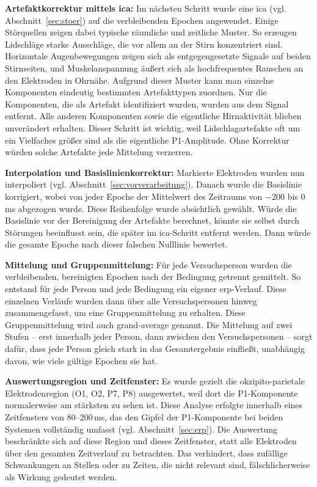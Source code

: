 \textbf{Artefaktkorrektur mittels \acrshort{ica}:} Im nächsten Schritt wurde eine \acrshort{ica} (vgl. Abschnitt~\ref{sec:stoer}) auf die verbleibenden Epochen angewendet. Einige Störquellen zeigen dabei typische räumliche und zeitliche Muster. So erzeugen Lidschläge starke Ausschläge, die vor allem an der Stirn konzentriert sind. Horizontale Augenbewegungen zeigen sich als entgegengesetzte Signale auf beiden Stirnseiten, und Muskelanspannung äußert sich als hochfrequentes Rauschen an den Elektroden in Ohrnähe. Aufgrund dieser Muster kann man einzelne Komponenten eindeutig bestimmten Artefakttypen zuordnen. Nur die Komponenten, die als Artefakt identifiziert wurden, wurden aus dem Signal entfernt. Alle anderen Komponenten sowie die eigentliche Hirnaktivität blieben unverändert erhalten. Dieser Schritt ist wichtig, weil Lidschlagartefakte oft um ein Vielfaches größer sind als die eigentliche P1-Amplitude. Ohne Korrektur würden solche Artefakte jede Mittelung verzerren.

\textbf{Interpolation und Basislinienkorrektur:} Markierte Elektroden wurden nun interpoliert (vgl. Abschnitt~\ref{sec:vorverarbeitung}). Danach wurde die Basislinie korrigiert, wobei von jeder Epoche der Mittelwert des Zeitraums von $-$200 bis 0\,ms abgezogen wurde. Diese Reihenfolge wurde absichtlich gewählt. Würde die Basislinie vor der Bereinigung der Artefakte berechnet, könnte sie selbst durch Störungen beeinflusst sein, die später im \acrshort{ica}-Schritt entfernt werden. Dann würde die gesamte Epoche nach dieser falschen Nulllinie bewertet.

\textbf{Mittelung und Gruppenmittelung:} Für jede Versuchsperson wurden die verbleibenden, bereinigten Epochen nach der Bedingung getrennt gemittelt. So entstand für jede Person und jede Bedingung ein eigener \acrshort{erp}-Verlauf. Diese einzelnen Verläufe wurden dann über alle Versuchspersonen hinweg zusammengefasst, um eine Gruppenmittelung zu erhalten. Diese Gruppenmittelung wird auch \gls{grand-average} genannt. Die Mittelung auf zwei Stufen -- erst innerhalb jeder Person, dann zwischen den Versuchspersonen -- sorgt dafür, dass jede Person gleich stark in das Gesamtergebnis einfließt, unabhängig davon, wie viele gültige Epochen sie hat.

\textbf{Auswertungsregion und Zeitfenster:} Es wurde gezielt die okzipito-parietale Elektrodenregion (O1, O2, P7, P8) ausgewertet, weil dort die P1-Komponente normalerweise am stärksten zu sehen ist. Diese Analyse erfolgte innerhalb eines Zeitfensters von 80--200\,ms, das den Gipfel der P1-Komponente bei beiden Systemen vollständig umfasst (vgl. Abschnitt~\ref{sec:erp}). Die Auswertung beschränkte sich auf diese Region und dieses Zeitfenster, statt alle Elektroden über den gesamten Zeitverlauf zu betrachten. Das verhindert, dass zufällige Schwankungen an Stellen oder zu Zeiten, die nicht relevant sind, fälschlicherweise als Wirkung gedeutet werden.

